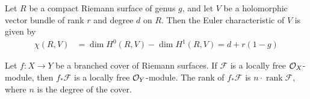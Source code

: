 \documentclass[12pt]{article}
\begin{document}
\begin{theorem}
     Let $R$ be a compact Riemann surface of genus $g$, and let $V$ be a holomorphic vector bundle of rank $r$ and degree $d$ on $R$. Then the Euler characteristic of $V$ is given by \begin{align*}
        \chi(R,V) & = \dim H^0(R,V) - \dim H^1(R,V) = d + r(1-g)
    \end{align*}
\end{theorem}

\begin{lemma}
Let $f : X \to Y$ be a branched cover of Riemann surfaces. 
If $\mathcal{F}$ is a locally free ${\mathcal{O}}_X$-module, 
then $f_*\mathcal{F}$ is a locally free ${\mathcal{O}}_Y$-module. The rank of $f_*\mathcal{F}$ is 
$n \cdot \operatorname{rank}\mathcal{F}$, where $n$ is the degree of the cover.
\end{lemma}
\end{document}
